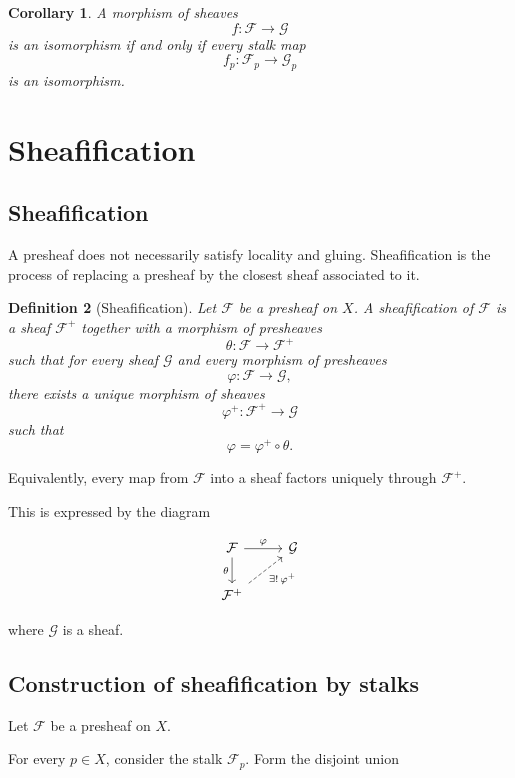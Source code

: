 \documentclass[12pt,a4paper]{article}
\theoremstyle{notespace}
\newtheorem{definition}{Definition}[subsection]
\newtheorem{corollary}[definition]{Corollary}
\begin{document}
\begin{corollary}
	A morphism of sheaves
	\[
	f : \mathcal F \longrightarrow \mathcal G
	\]
	is an isomorphism if and only if every stalk map
	\[
	f_p : \mathcal F_p \longrightarrow \mathcal G_p
	\]
	is an isomorphism.
\end{corollary}

\section{Sheafification}

\subsection{Sheafification}
A presheaf does not necessarily satisfy locality and gluing.
Sheafification is the process of replacing a presheaf by the closest sheaf
associated to it.

\begin{definition}[Sheafification]
	Let $\mathcal F$ be a presheaf on $X$.
	A sheafification of $\mathcal F$ is a sheaf $\mathcal F^+$ together with a
	morphism of presheaves
	\[
	\theta : \mathcal F \longrightarrow \mathcal F^+
	\]
	such that for every sheaf $\mathcal G$ and every morphism of presheaves
	\[
	\varphi : \mathcal F \longrightarrow \mathcal G,
	\]
	there exists a unique morphism of sheaves
	\[
	\varphi^+ : \mathcal F^+ \longrightarrow \mathcal G
	\]
	such that
	\[
	\varphi = \varphi^+ \circ \theta.
	\]
\end{definition}

Equivalently, every map from $\mathcal F$ into a sheaf factors uniquely through
$\mathcal F^+$.

This is expressed by the diagram

\[
\begin{tikzcd}
	\mathcal F \arrow[r, "\varphi"] \arrow[d, "\theta"'] &
	\mathcal G \\
	\mathcal F^+ \arrow[ur, dashed, "\exists !\,\varphi^+"'] &
\end{tikzcd}
\]

where $\mathcal G$ is a sheaf.

\subsection{Construction of sheafification by stalks}
Let $\mathcal F$ be a presheaf on $X$.

For every $p \in X$, consider the stalk $\mathcal F_p$.
Form the disjoint union
\end{document}
